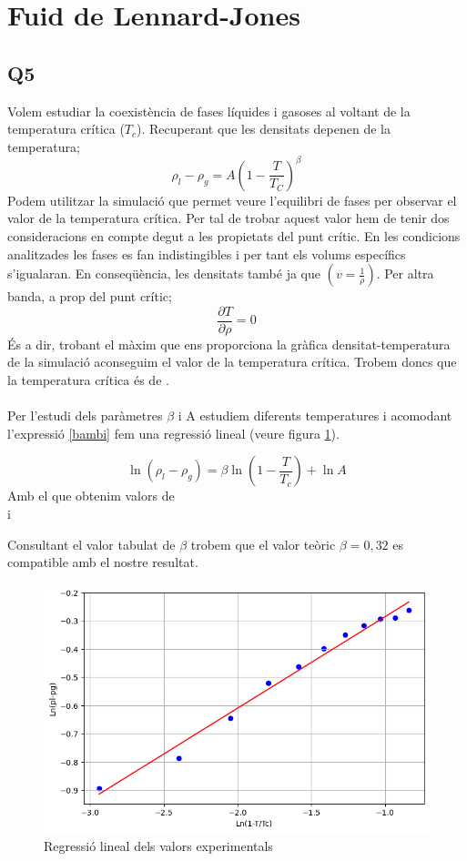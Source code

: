 \documentclass{article}
\begin{document}
	\section{Fuid de Lennard-Jones}
	
	\subsection*{Q5}
	
	Volem estudiar la coexistència de fases líquides i gasoses al voltant de la temperatura crítica ($T_c$). Recuperant que les densitats depenen de la temperatura;
	\begin{equation} \label{bambi}
		\rho_l-\rho_g = A\left( 1-\frac{T}{T_C}\right)^\beta
	\end{equation}
	Podem utilitzar la simulació que permet veure l'equilibri de fases per observar el valor de la temperatura crítica. 
	Per tal de trobar aquest valor hem de tenir dos consideracions en compte degut a les propietats del punt crític. En les condicions analitzades les fases es fan indistingibles i per tant els volums específics s'igualaran.
	En conseqüència, les densitats també ja que $(v=\frac{1}{\rho})$.
	Per altra banda, a prop del punt crític;
	\begin{equation}
		\frac{\partial T}{\partial \rho}=0
	\end{equation}
	És a dir, trobant el màxim que ens proporciona la gràfica densitat-temperatura de la simulació aconseguim el valor de la temperatura crítica.
	Trobem doncs que la temperatura crítica és de
	.
	\\
	\\
	
	Per l'estudi dels paràmetres $\beta$ i A estudiem diferents temperatures i acomodant l'expressió \ref{bambi} fem una regressió lineal (veure figura \ref{1}).
	
	\begin{equation}
		\ln(\rho_l-\rho_g)=\beta \ln\left(1-\frac{T}{T_c}\right)+ \ln A
	\end{equation}
	Amb el que obtenim valors de
	\\
	 i 
	
	Consultant el valor tabulat de $\beta$ trobem que el valor teòric $\beta=0,32$ es compatible amb el nostre resultat.
	\begin{figure}[h!] 
		\centering
		\includegraphics[width=0.7\linewidth]{regresionq5.png}
		\caption{Regressió lineal dels valors experimentals}
		\label{1}
	\end{figure}
	
\end{document}
